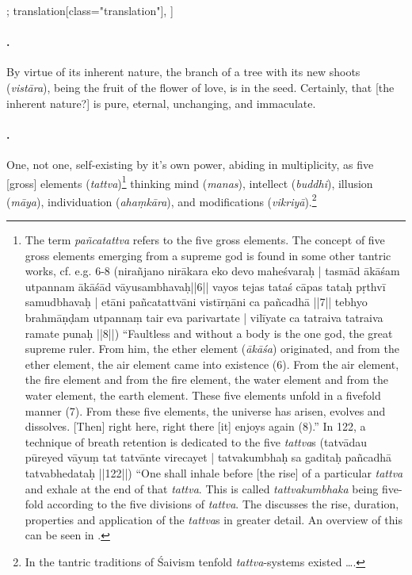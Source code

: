 \begin{alignment}[
  texts=edition[class="edition"];
  translation[class="translation"],
  ]
\begin{translation}
\begin{tlate}
      \paragraph{\textsuperscript{}.} By virtue of its inherent nature, the branch of a tree with its new shoots (\textit{vistāra}), being the fruit of the flower of love, is in the seed. Certainly, that [the inherent nature?] is pure, eternal, unchanging, and immaculate.
      \paragraph{\textsuperscript{}.} One, not one, self-existing by it's own power, abiding in multiplicity, as five [gross] elements (\textit{tattva})\footnote{The term \textit{pañcatattva} refers to the five gross elements. The concept of five gross elements emerging from a supreme god is found in some other tantric works, cf. e.g.  6-8 (nirañjano nirākara eko devo maheśvaraḥ | tasmād ākāśam utpannam ākāśād vāyusambhavaḥ||6|| vayos tejas tataś cāpas tataḥ pṛthvī samudbhavaḥ | etāni pañcatattvāni vistīrṇāni ca pañcadhā ||7|| tebhyo brahmāṇḍam utpannaṃ tair eva parivartate | vilīyate ca tatraiva tatraiva ramate punaḥ ||8||) 
``Faultless and without a body is the one god, the great supreme ruler. From him, the ether element (\textit{ākāśa}) originated, and from the ether element, the air element came into existence (6). From the air element, the fire element and from the fire element, the water element and from the water element, the earth element. These five elements unfold in a fivefold manner (7). From these five elements, the universe has arisen, evolves and dissolves. [Then] right here, right there [it] enjoys again (8).'' In  122, a technique of breath retention is dedicated to the five \textit{tattva}s (tatvādau pūreyed vāyuṃ tat tatvānte virecayet | tatvakumbhaḥ sa gaditaḥ pañcadhā tatvabhedataḥ ||122||) ``One shall inhale before [the rise] of a particular \textit{tattva} and exhale at the end of that \textit{tattva}. This is called \textit{tattvakumbhaka} being five-fold according to the five divisions of \textit{tattva}. The  discusses the rise, duration, properties and application of the \textit{tattva}s in greater detail. An overview of this can be seen in \citeauthor[2021: Appendix-]{kumbhaka}.} thinking mind (\textit{manas}), intellect (\textit{buddhi}), illusion (\textit{māya}), individuation (\textit{ahaṃkāra}), and modifications (\textit{vikriyā}).\footnote{In the tantric traditions of Śaivism tenfold \textit{tattva}-systems existed \ldots.}

\end{tlate}
\end{translation}
\end{alignment}
